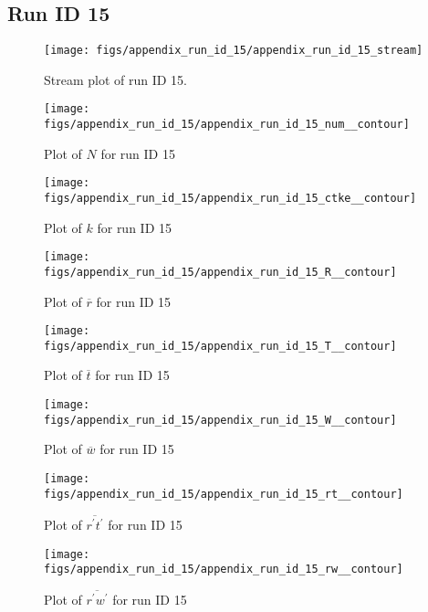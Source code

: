 \subsection{Run ID 15}
\begin{figure}[H]
\centering
\texttt{[image: figs/appendix\_run\_id\_15/appendix\_run\_id\_15\_stream]}
\caption{Stream plot of run ID 15.}
\label{fig:appendix_run_id_15_stream}
\end{figure}


\begin{figure}[H]
\centering
\texttt{[image: figs/appendix\_run\_id\_15/appendix\_run\_id\_15\_num\_\_contour]}
\caption{Plot of $N$ for run ID 15}
\label{fig:appendix_run_id_15_num__contour}
\end{figure}


\begin{figure}[H]
\centering
\texttt{[image: figs/appendix\_run\_id\_15/appendix\_run\_id\_15\_ctke\_\_contour]}
\caption{Plot of $k$ for run ID 15}
\label{fig:appendix_run_id_15_ctke__contour}
\end{figure}


\begin{figure}[H]
\centering
\texttt{[image: figs/appendix\_run\_id\_15/appendix\_run\_id\_15\_R\_\_contour]}
\caption{Plot of $\overline{r}$ for run ID 15}
\label{fig:appendix_run_id_15_R__contour}
\end{figure}


\begin{figure}[H]
\centering
\texttt{[image: figs/appendix\_run\_id\_15/appendix\_run\_id\_15\_T\_\_contour]}
\caption{Plot of $\overline{t}$ for run ID 15}
\label{fig:appendix_run_id_15_T__contour}
\end{figure}


\begin{figure}[H]
\centering
\texttt{[image: figs/appendix\_run\_id\_15/appendix\_run\_id\_15\_W\_\_contour]}
\caption{Plot of $\overline{w}$ for run ID 15}
\label{fig:appendix_run_id_15_W__contour}
\end{figure}


\begin{figure}[H]
\centering
\texttt{[image: figs/appendix\_run\_id\_15/appendix\_run\_id\_15\_rt\_\_contour]}
\caption{Plot of $\overline{r^\prime t^\prime}$ for run ID 15}
\label{fig:appendix_run_id_15_rt__contour}
\end{figure}


\begin{figure}[H]
\centering
\texttt{[image: figs/appendix\_run\_id\_15/appendix\_run\_id\_15\_rw\_\_contour]}
\caption{Plot of $\overline{r^\prime w^\prime}$ for run ID 15}
\label{fig:appendix_run_id_15_rw__contour}
\end{figure}


